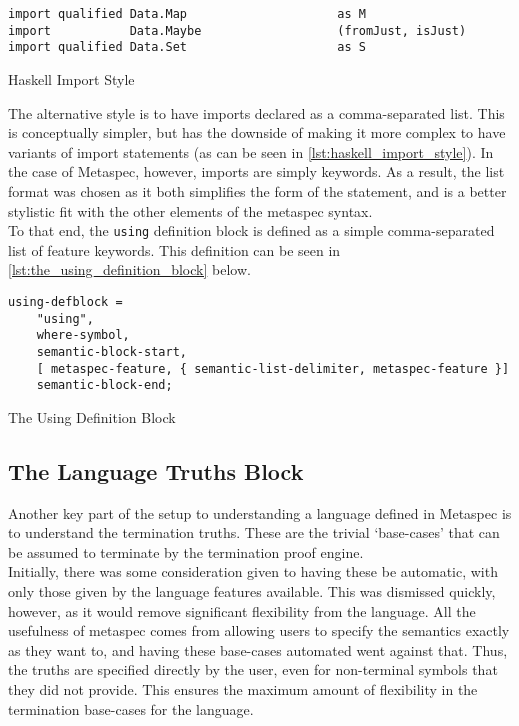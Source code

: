 \begin{listing}[!htb]
\begin{verbatim}
import qualified Data.Map                     as M
import           Data.Maybe                   (fromJust, isJust)
import qualified Data.Set                     as S
\end{verbatim}
\caption{Haskell Import Style}
\label{lst:haskell_import_style}
\end{listing}

The alternative style is to have imports declared as a comma-separated list. 
This is conceptually simpler, but has the downside of making it more complex to have variants of import statements (as can be seen in \autoref{lst:haskell_import_style}).
In the case of Metaspec, however, imports are simply keywords. 
As a result, the list format was chosen as it both simplifies the form of the statement, and is a better stylistic fit with the other elements of the metaspec syntax. \\

To that end, the \texttt{using} definition block is defined as a simple comma-separated list of feature keywords.
This definition can be seen in \autoref{lst:the_using_definition_block} below.

\begin{listing}[!htb]
\begin{verbatim}
using-defblock =
    "using",
    where-symbol,
    semantic-block-start,
    [ metaspec-feature, { semantic-list-delimiter, metaspec-feature }]
    semantic-block-end;
\end{verbatim}
\caption{The Using Definition Block}
\label{lst:the_using_definition_block}
\end{listing}


\subsection{The Language Truths Block} %
\label{sub:the_language_truths_block}
Another key part of the setup to understanding a language defined in Metaspec is to understand the termination truths.
These are the trivial `base-cases' that can be assumed to terminate by the termination proof engine.\\

Initially, there was some consideration given to having these be automatic, with only those given by the language features available.
This was dismissed quickly, however, as it would remove significant flexibility from the language. 
All the usefulness of metaspec comes from allowing users to specify the semantics exactly as they want to, and having these base-cases automated went against that.
Thus, the truths are specified directly by the user, even for non-terminal symbols that they did not provide. 
This ensures the maximum amount of flexibility in the termination base-cases for the language.\\

